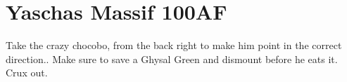 \chapter{Yaschas Massif 100AF}

Take the crazy chocobo, from the back right to make him point in the correct direction.. Make sure to save a Ghysal Green and dismount before he eats it.  Crux out.
\newline